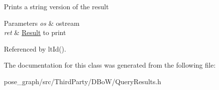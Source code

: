 Prints a string version of the result 
\begin{DoxyParams}{Parameters}
{\em os} & ostream \\
\hline
{\em ret} & \hyperlink{classDBoW2_1_1Result}{Result} to print \\
\hline
\end{DoxyParams}


Referenced by lt\+Id().



The documentation for this class was generated from the following file\+:\begin{DoxyCompactItemize}
\item 
pose\+\_\+graph/src/\+Third\+Party/\+D\+Bo\+W/Query\+Results.\+h\end{DoxyCompactItemize}
